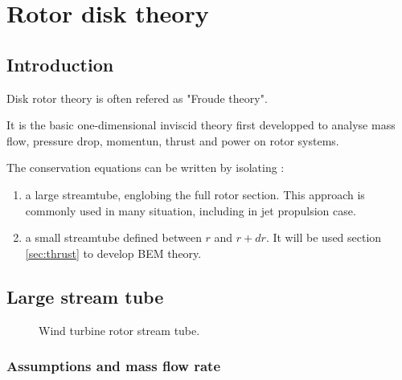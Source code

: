 
\section{Rotor disk theory}

\subsection{Introduction}

Disk rotor theory is often refered as  "Froude theory".

It is the basic one-dimensional inviscid theory first developped to analyse
mass flow, pressure drop, momentun, thrust and power on rotor systems.


The conservation equations can be written by isolating  :

  \begin{enumerate}
    \item a large streamtube, englobing the full rotor section. This approach is commonly used in many situation,
    including in jet propulsion case.
    \item a small streamtube defined between $r$ and $r+dr$.
    It will be used section \ref{sec:thrust} to develop BEM theory.
  \end{enumerate}


\subsection{Large stream tube}

\begin{figure}[h]
  \begin{center}
  
  \caption{ Wind turbine rotor stream tube.}
  \label{fig:config_wind_turbine}
  \end{center}
\end{figure}



\subsubsection{\sc Assumptions and mass flow rate }
\label{sec:assumptions}


